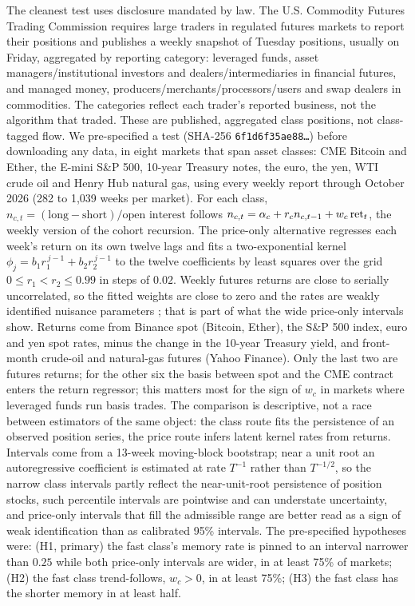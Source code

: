 The cleanest test uses disclosure mandated by law. The U.S. Commodity Futures Trading Commission requires large traders in regulated futures markets to report their positions and publishes a weekly snapshot of Tuesday positions, usually on Friday, aggregated by reporting category: leveraged funds, asset managers/institutional investors and dealers/intermediaries in financial futures, and managed money, producers/merchants/processors/users and swap dealers in commodities. The categories reflect each trader's reported business, not the algorithm that traded. These are published, aggregated class positions, not class-tagged flow. We pre-specified a test (SHA-256 \texttt{6f1d6f35ae88\ldots}) before downloading any data, in eight markets that span asset classes: CME Bitcoin and Ether, the E-mini S\&P 500, 10-year Treasury notes, the euro, the yen, WTI crude oil and Henry Hub natural gas, using every weekly report through October 2026 (282 to 1{,}039 weeks per market). For each class, $n_{c,t}=(\text{long}-\text{short})/\text{open interest}$ follows $n_{c,t}=\alpha_c+r_cn_{c,t-1}+w_c\,{\rm ret}_t$, the weekly version of the cohort recursion. The price-only alternative regresses each week's return on its own twelve lags and fits a two-exponential kernel $\phi_j=b_1r_1^{\,j-1}+b_2r_2^{\,j-1}$ to the twelve coefficients by least squares over the grid $0\le r_1<r_2\le0.99$ in steps of $0.02$. Weekly futures returns are close to serially uncorrelated, so the fitted weights are close to zero and the rates are weakly identified nuisance parameters \citep{andrews2012}; that is part of what the wide price-only intervals show. Returns come from Binance spot (Bitcoin, Ether), the S\&P 500 index, euro and yen spot rates, minus the change in the 10-year Treasury yield, and front-month crude-oil and natural-gas futures (Yahoo Finance). Only the last two are futures returns; for the other six the basis between spot and the CME contract enters the return regressor; this matters most for the sign of $w_c$ in markets where leveraged funds run basis trades. The comparison is descriptive, not a race between estimators of the same object: the class route fits the persistence of an observed position series, the price route infers latent kernel rates from returns. Intervals come from a 13-week moving-block bootstrap; near a unit root an autoregressive coefficient is estimated at rate $T^{-1}$ rather than $T^{-1/2}$, so the narrow class intervals partly reflect the near-unit-root persistence of position stocks, such percentile intervals are pointwise and can understate uncertainty, and price-only intervals that fill the admissible range are better read as a sign of weak identification than as calibrated 95\% intervals. The pre-specified hypotheses were: (H1, primary) the fast class's memory rate is pinned to an interval narrower than $0.25$ while both price-only intervals are wider, in at least 75\% of markets; (H2) the fast class trend-follows, $w_c>0$, in at least 75\%; (H3) the fast class has the shorter memory in at least half.

